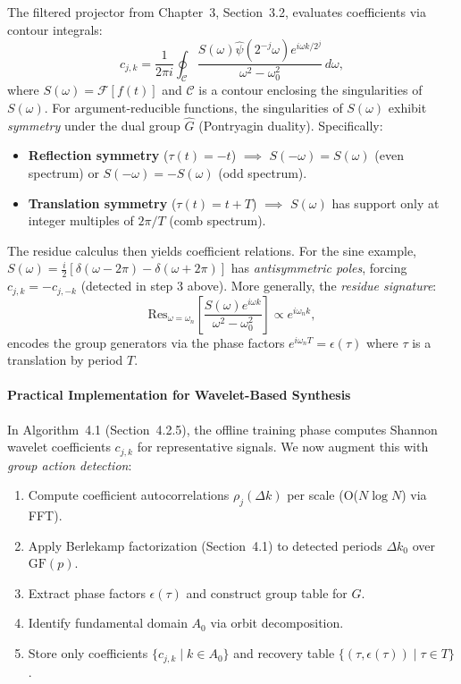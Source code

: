 The filtered projector from Chapter~3, Section~3.2, evaluates coefficients via contour integrals:
\[
c_{j,k} = \frac{1}{2\pi i} \oint_{\mathcal{C}} \frac{S(\omega) \widehat{\psi}(2^{-j}\omega) e^{i\omega k / 2^j}}{\omega^2 - \omega_0^2} \, d\omega,
\]
where $S(\omega) = \mathcal{F}[f(t)]$ and $\mathcal{C}$ is a contour enclosing the singularities of $S(\omega)$. For argument-reducible functions, the singularities of $S(\omega)$ exhibit \emph{symmetry} under the dual group $\widehat{G}$ (Pontryagin duality). Specifically:
\begin{itemize}
\item \textbf{Reflection symmetry} ($\tau(t) = -t$) $\implies$ $S(-\omega) = S(\omega)$ (even spectrum) or $S(-\omega) = -S(\omega)$ (odd spectrum).
\item \textbf{Translation symmetry} ($\tau(t) = t + T$) $\implies$ $S(\omega)$ has support only at integer multiples of $2\pi/T$ (comb spectrum).
\end{itemize}

The residue calculus then yields coefficient relations. For the sine example, $S(\omega) = \frac{i}{2}[\delta(\omega - 2\pi) - \delta(\omega + 2\pi)]$ has \emph{antisymmetric poles}, forcing $c_{j,k} = -c_{j,-k}$ (detected in step 3 above). More generally, the \emph{residue signature}:
\[
\text{Res}_{\omega = \omega_n} \left[ \frac{S(\omega) e^{i\omega k}}{\omega^2 - \omega_0^2} \right] \propto e^{i\omega_n k},
\]
encodes the group generators via the phase factors $e^{i\omega_n T} = \epsilon(\tau)$ where $\tau$ is a translation by period $T$.

\paragraph{Practical Implementation for Wavelet-Based Synthesis}

In Algorithm~4.1 (Section~4.2.5), the offline training phase computes Shannon wavelet coefficients $c_{j,k}$ for representative signals. We now augment this with \emph{group action detection}:

\begin{enumerate}
\item[\textbf{1a.}] Compute coefficient autocorrelations $\rho_j(\Delta k)$ per scale (O($N \log N$) via FFT).
\item[\textbf{1b.}] Apply Berlekamp factorization (Section~4.1) to detected periods $\Delta k_0$ over $\mathrm{GF}(p)$.
\item[\textbf{1c.}] Extract phase factors $\epsilon(\tau)$ and construct group table for $G$.
\item[\textbf{1d.}] Identify fundamental domain $A_0$ via orbit decomposition.
\item[\textbf{1e.}] Store only coefficients $\{c_{j,k} \mid k \in A_0\}$ and recovery table $\{(\tau, \epsilon(\tau)) \mid \tau \in T\}$.
\end{enumerate}

